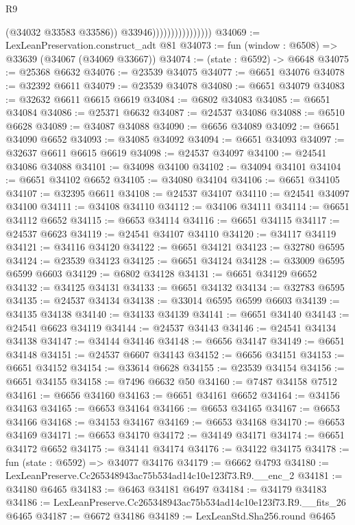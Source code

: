 \begin{lexlean}{R9}
\begin{coremodule}
                                      (@34032 @33583 @33586))
                                    @33946))))))))))))))))
@34069 := LexLeanPreservation.construct_adt @81
@34073 := fun (window : @6508) => @33639 (@34067 (@34069 @33667))
@34074 := (state : @6592) -> @6648
@34075 := @25368 @6632
@34076 := @23539 @34075
@34077 := @6651 @34076
@34078 := @32392 @6611
@34079 := @23539 @34078
@34080 := @6651 @34079
@34083 := @32632 @6611 @6615 @6619
@34084 := @6802 @34083
@34085 := @6651 @34084
@34086 := @25371 @6632
@34087 := @24537 @34086
@34088 := @6510 @6628
@34089 := @34087 @34088
@34090 := @6656 @34089
@34092 := @6651 @34090 @6652
@34093 := @34085 @34092
@34094 := @6651 @34093
@34097 := @32637 @6611 @6615 @6619
@34098 := @24537 @34097
@34100 := @24541 @34086 @34088
@34101 := @34098 @34100
@34102 := @34094 @34101
@34104 := @6651 @34102 @6652
@34105 := @34080 @34104
@34106 := @6651 @34105
@34107 := @32395 @6611
@34108 := @24537 @34107
@34110 := @24541 @34097 @34100
@34111 := @34108 @34110
@34112 := @34106 @34111
@34114 := @6651 @34112 @6652
@34115 := @6653 @34114
@34116 := @6651 @34115
@34117 := @24537 @6623
@34119 := @24541 @34107 @34110
@34120 := @34117 @34119
@34121 := @34116 @34120
@34122 := @6651 @34121
@34123 := @32780 @6595
@34124 := @23539 @34123
@34125 := @6651 @34124
@34128 := @33009 @6595 @6599 @6603
@34129 := @6802 @34128
@34131 := @6651 @34129 @6652
@34132 := @34125 @34131
@34133 := @6651 @34132
@34134 := @32783 @6595
@34135 := @24537 @34134
@34138 := @33014 @6595 @6599 @6603
@34139 := @34135 @34138
@34140 := @34133 @34139
@34141 := @6651 @34140
@34143 := @24541 @6623 @34119
@34144 := @24537 @34143
@34146 := @24541 @34134 @34138
@34147 := @34144 @34146
@34148 := @6656 @34147
@34149 := @6651 @34148
@34151 := @24537 @6607 @34143
@34152 := @6656 @34151
@34153 := @6651 @34152
@34154 := @33614 @6628
@34155 := @23539 @34154
@34156 := @6651 @34155
@34158 := @7496 @6632 @50
@34160 := @7487 @34158 @7512
@34161 := @6656 @34160
@34163 := @6651 @34161 @6652
@34164 := @34156 @34163
@34165 := @6653 @34164
@34166 := @6653 @34165
@34167 := @6653 @34166
@34168 := @34153 @34167
@34169 := @6653 @34168
@34170 := @6653 @34169
@34171 := @6653 @34170
@34172 := @34149 @34171
@34174 := @6651 @34172 @6652
@34175 := @34141 @34174
@34176 := @34122 @34175
@34178 := fun (state : @6592) => @34077 @34176
@34179 := @6662 @4793
@34180 := LexLeanPreserve.Cc265348943ac75b534ad14c10e123f73.R9.__enc_2
@34181 := @34180 @6465
@34183 := @6463 @34181 @6497
@34184 := @34179 @34183
@34186 := LexLeanPreserve.Cc265348943ac75b534ad14c10e123f73.R9.__fits_26 @6465
@34187 := @6672 @34186
@34189 := LexLeanStd.Sha256.round @6465

\end{coremodule}
\end{lexlean}
